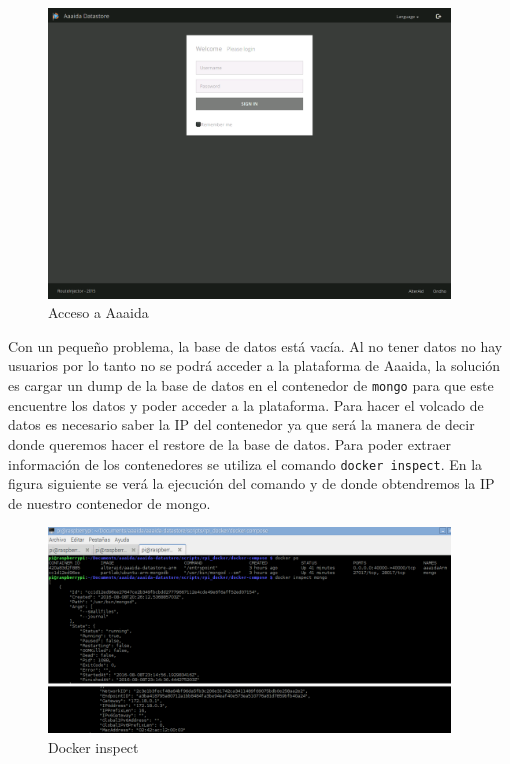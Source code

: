 \begin{figure}[htb]
\begin{center}
\includegraphics[width=0.95\textwidth]{./setup/AaaidaDatastore}
\caption{Acceso a Aaaida}
\label{webLog:LoggeoAaaida}
\end{center}
\end{figure} 

Con un pequeño problema, la base de datos está vacía. Al no tener datos no hay usuarios por lo tanto  no se podrá acceder a la plataforma de Aaaida, la solución es cargar un dump de la base de datos en el contenedor de \texttt{mongo} para que este encuentre los datos y poder acceder a la plataforma.  Para hacer el volcado de datos es necesario saber la IP del contenedor ya que será la manera de decir donde queremos hacer el restore de la base de datos. Para poder extraer información de los contenedores se utiliza el comando \texttt{docker inspect}. En la figura siguiente se verá la ejecución del comando y de donde obtendremos la IP de nuestro contenedor de mongo.
\pagebreak

\begin{figure}[htb]
\begin{center}
\includegraphics[width=0.95\textwidth]{./setup/dockerinspect}
\caption{Docker inspect}
\label{insp:dockerInspect}
\end{center}
\end{figure} 

